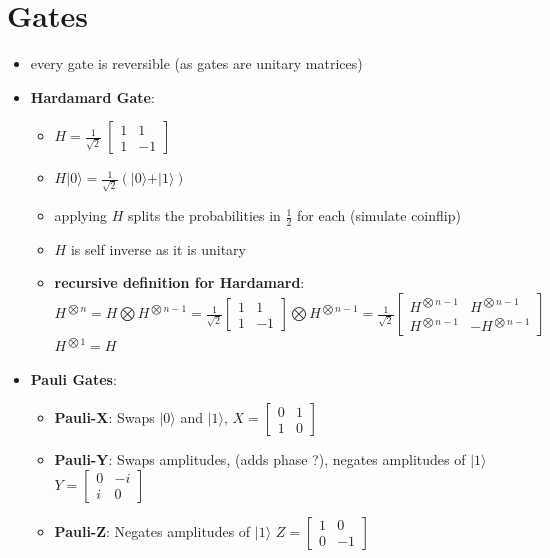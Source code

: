 \documentclass[12pt,a4paper]{article}
\newcommand{\ket}[1]{\vert #1 \rangle}
\begin{document}
\section{Gates}
\begin{itemize}
\item every gate is reversible (as gates are unitary matrices)
\item \textbf{Hardamard Gate}:
\begin{itemize}
\item $H = \frac{1}{\sqrt{2}}\ \begin{bmatrix}1 & 1\\1 & -1 \end{bmatrix}$
\item $H \ket{0} = \frac{1}{\sqrt{2}}(\ket{0}+\ket{1})$
\item applying $H$ splits the probabilities in $\frac{1}{2}$ for each (simulate coinflip)
\item $H$ is self inverse as it is unitary
\item \textbf{recursive definition for Hardamard}:\\
$H^{\bigotimes n} = H \bigotimes H^{\bigotimes n-1} = \frac{1}{\sqrt{2}} \begin{bmatrix}1 & 1\\1 & -1 \end{bmatrix} \bigotimes H^{\bigotimes n-1} = \frac{1}{\sqrt{2}} \begin{bmatrix}H^{\bigotimes n-1} & H^{\bigotimes n-1}\\H^{\bigotimes n-1} & -H^{\bigotimes n-1} \end{bmatrix}$\\
$H^{\bigotimes 1} = H$
\end{itemize}
\item \textbf{Pauli Gates}:
\begin{itemize}
\item \textbf{Pauli-X}: Swaps $\ket{0}$ and $\ket{1}$, $X = \begin{bmatrix}0 & 1\\1 & 0 \end{bmatrix}$
\item \textbf{Pauli-Y}: Swaps amplitudes, (adds phase ?), negates amplitudes of $\ket{1}$ $Y = \begin{bmatrix}0 & -i\\i & 0 \end{bmatrix}$
\item \textbf{Pauli-Z}: Negates amplitudes of $\ket{1}$ $Z = \begin{bmatrix}1 & 0\\0 & -1 \end{bmatrix}$
\end{itemize}


\end{itemize}
\end{document}
